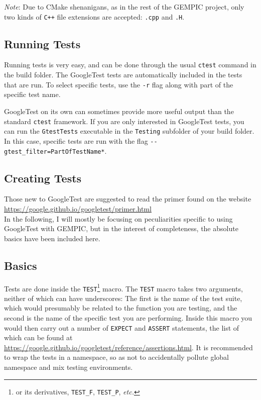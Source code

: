 \documentclass[11pt]{article}
\newcommand{\gt}{GoogleTest}
\newcommand{\ctest}{\texttt{ctest}}
\begin{document}
\emph{Note}: Due to CMake shenanigans, as in the rest of the GEMPIC project, only two kinds of \verb|C++| file extensions are accepted: \verb|.cpp| and \verb|.H|.

\subsection{Running Tests}
Running tests is very easy, and can be done through the usual \ctest{} command in the build folder. The \gt{} tests are automatically included in the tests that are run.
To select specific tests, use the \verb|-r| flag along with part of the specific test name.

\gt{} on its own can sometimes provide more useful output than the standard \ctest{} framework. If you are only interested in \gt{} tests, you can run the \verb|GtestTests| executable in the \verb|Testing| subfolder of your build folder. In this case, specific tests are run with the flag \verb|--gtest_filter=PartOfTestName*|.

\subsection{Creating Tests}
Those new to \gt{} are suggested to read the primer found on the website\\\url{https://google.github.io/googletest/primer.html}\\
In the following, I will mostly be focusing on peculiarities specific to using \gt{} with GEMPIC, but in the interest of completeness, the absolute basics have been included here.
\subsection{Basics}
Tests are done inside the \lstinline{TEST}\footnote{or its derivatives, \lstinline{TEST_F}, \lstinline{TEST_P}, \emph{etc.}} macro.
 The \lstinline{TEST} macro takes two arguments, neither of which can have underscores: The first is the name of the test suite, which would presumably be related to the function you are testing, and the second is the name of the specific test you are performing. Inside this macro you would then carry out a number of \lstinline{EXPECT} and \lstinline{ASSERT} statements, the list of which can be found at \url{https://google.github.io/googletest/reference/assertions.html}.
 It is recommended to wrap the tests in a namespace, so as not to accidentally pollute global namespace and mix testing environments.
\end{document}
